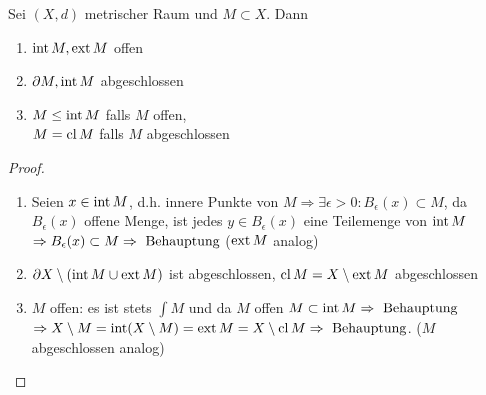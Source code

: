 \begin{satz}
    Sei $(X,d)$ metrischer Raum und $M\subset X$. Dann
    \begin{enumerate}[label={\arabic*)}]
    \item $\operatorname{int} M, \operatorname{ext} M$ offen
    \item $\partial M, \operatorname{int} M$ abgeschlossen
    \item $M \leq \operatorname{int} M$ falls $M$ offen, \\
    $M= \operatorname{cl} M$ falls $M$ abgeschlossen
    \end{enumerate}
\end{satz}

\begin{proof}
    \begin{enumerate}[label={\arabic*)}]
    \item Seien $x \in \operatorname{int} M$, d.h. innere Punkte von $M \Rightarrow \exists \epsilon > 0 \colon B_{\epsilon}(x) \subset M$, da $B_{\epsilon}(x)$ offene Menge, ist jedes $y \in B_{\epsilon}(x)$ eine Teilemenge von $\operatorname{int} M$ $\Rightarrow B_{\epsilon}(x) \subset M \Rightarrow \text{ Behauptung}$ ($\operatorname{ext} M$ analog)
    \item $\partial X\setminus (\operatorname{int} M \cup \operatorname{ext} M)$ ist abgeschlossen, $\operatorname{cl} M = X\setminus\operatorname{ext} M$ abgeschlossen
    \item $M$ offen: es ist stets $\int M$ und da $M$ offen $M \subset \operatorname{int} M \Rightarrow \text{ Behauptung}$  $\Rightarrow X\setminus M = \operatorname{int}(X\setminus M) = \operatorname{ext} M = X \setminus \operatorname{cl} M \Rightarrow \text{ Behauptung}$.
    ($M$ abgeschlossen analog)
    \end{enumerate}\QEDA
\end{proof}